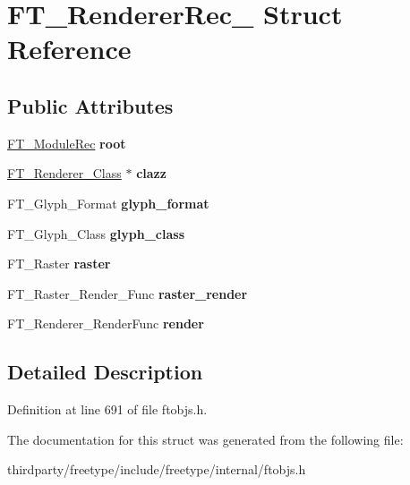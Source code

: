 \hypertarget{struct_f_t___renderer_rec__}{}\section{F\+T\+\_\+\+Renderer\+Rec\+\_\+ Struct Reference}
\label{struct_f_t___renderer_rec__}
\subsection*{Public Attributes}
\begin{DoxyCompactItemize}
\item 
\mbox{\label{struct_f_t___renderer_rec___a7c93326898f03a9eb224f57104fa2433}} 
\hyperlink{struct_f_t___module_rec__}{F\+T\+\_\+\+Module\+Rec} {\bfseries root}
\item 
\mbox{\label{struct_f_t___renderer_rec___a2b13c0a776ea7f589f41f576f9c4e8ad}} 
\hyperlink{struct_f_t___renderer___class__}{F\+T\+\_\+\+Renderer\+\_\+\+Class} $\ast$ {\bfseries clazz}
\item 
\mbox{\label{struct_f_t___renderer_rec___a478b14f577b633cea7043fb17d404721}} 
F\+T\+\_\+\+Glyph\+\_\+\+Format {\bfseries glyph\+\_\+format}
\item 
\mbox{\label{struct_f_t___renderer_rec___a38a591be1d20fb2b4d81e48ebb624dd7}} 
F\+T\+\_\+\+Glyph\+\_\+\+Class {\bfseries glyph\+\_\+class}
\item 
\mbox{\label{struct_f_t___renderer_rec___a9c54a2da84f5892e0563d032ebd1ee09}} 
F\+T\+\_\+\+Raster {\bfseries raster}
\item 
\mbox{\label{struct_f_t___renderer_rec___a6dc07268fc39d9dde130a5708607d19d}} 
F\+T\+\_\+\+Raster\+\_\+\+Render\+\_\+\+Func {\bfseries raster\+\_\+render}
\item 
\mbox{\label{struct_f_t___renderer_rec___a197bfeb9dde4aef8eee87bc3ea95312e}} 
F\+T\+\_\+\+Renderer\+\_\+\+Render\+Func {\bfseries render}
\end{DoxyCompactItemize}


\subsection{Detailed Description}


Definition at line 691 of file ftobjs.\+h.



The documentation for this struct was generated from the following file\+:\begin{DoxyCompactItemize}
\item 
thirdparty/freetype/include/freetype/internal/ftobjs.\+h\end{DoxyCompactItemize}

